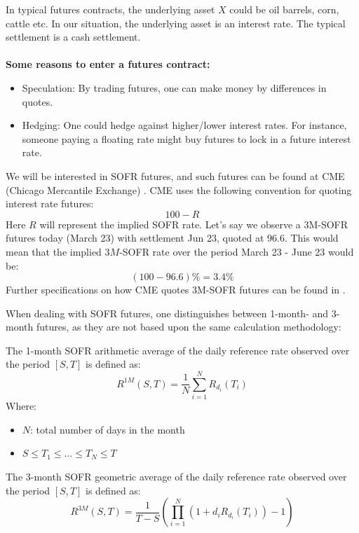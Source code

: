 In typical futures contracts, the underlying asset  
$X$ could be oil barrels, corn, cattle etc. In our situation, the underlying asset is an interest rate. The typical settlement is a cash settlement. 
\\~\\ 
\textbf{Some reasons to enter a futures contract:}
\begin{itemize}
    \item Speculation: By trading futures, one can make money by differences in quotes.  
    \item Hedging: One could hedge against higher/lower interest rates. For instance, someone paying a floating rate might buy futures to lock in a future interest rate. 
\end{itemize}



We will be interested in SOFR futures, and such futures can be found at CME (Chicago Mercantile Exchange) . CME uses the following convention for quoting interest rate futures: 
\[
100 - R
\]
Here $R$ will represent the implied SOFR rate. Let's say we observe a 3M-SOFR futures today (March 23) with settlement Jun 23, quoted at $96.6$. This would mean that the implied $3M$-SOFR rate over the period March 23 - June 23 would be: 
\[
(100-96.6)\% = 3.4\% 
\] 
Further specifications on how CME quotes 3M-SOFR futures can be found in  \cite{cmegroup-sofr-futures}. 

\newpage 

When dealing with SOFR futures, one distinguishes between 1-month- and 3-month futures, as they are not based upon the same calculation methodology:

\begin{definition}
The 1-month 
SOFR arithmetic average of the daily reference rate observed over the period $[S,T]$ is defined as: 
\[
R^{1M}(S,T) = \frac{1}{N}\sum_{i=1}^{N}R_{d_{i}}(T_{i})
\]
Where:
\begin{itemize}[leftmargin=*]
    \item $N$: total number of days in the month
    \item $S\leq T_{1} \leq \dots \leq T_{N} \leq T$ 
\end{itemize}
\end{definition}



\begin{definition}
The 3-month 
SOFR geometric average of the daily reference rate observed over the period $[S,T]$ is defined as: 
\[
R^{3M}(S,T) = \frac{1}{T-S}\left(
\prod_{i=1}^{N}(1+d_{i}R_{d_{i}}(T_{i})) - 1
\right)
\]
\end{definition}



